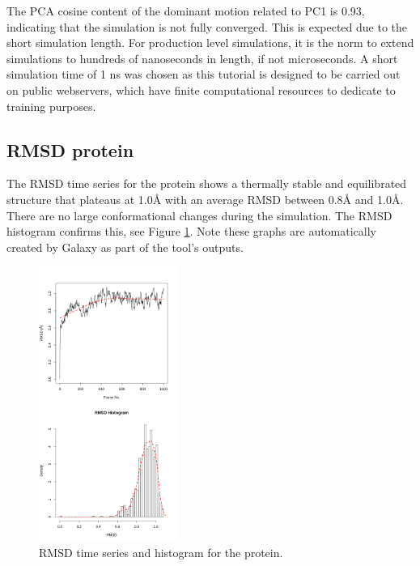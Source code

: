 \documentclass[twocolumn]{bmcart}%
\begin{document}
The PCA cosine content of the dominant motion related to PC1 is 0.93, indicating that the simulation is not fully converged. This is expected due to the short simulation length. For production level simulations, it is the norm to extend simulations to hundreds of nanoseconds in length, if not microseconds. A short simulation time of 1 ns was chosen as this tutorial is designed to be carried out on public webservers, which have finite computational resources to dedicate to training purposes. 

\subsection*{RMSD protein}
The RMSD time series for the protein shows a thermally stable and equilibrated structure that plateaus at 1.0{\AA} with an average RMSD between 0.8{\AA} and 1.0{\AA}. There are no large conformational changes during the simulation. The RMSD histogram confirms this, see Figure \ref{fig:rmsdprotein}. Note these graphs are automatically created by Galaxy as part of the tool's outputs.

\begin{figure}[ht!]
  \includegraphics[width=0.4\textwidth]{htmd_analysis_rmsd1_merge}
  \caption{
      RMSD time series and histogram for the protein.}
  \label{fig:rmsdprotein}
\end{figure}
\end{document}
